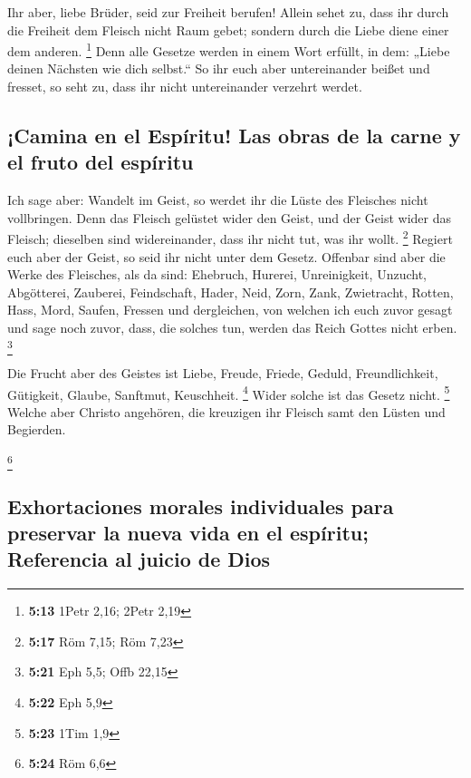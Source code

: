  Ihr aber, liebe Brüder, seid zur Freiheit berufen!
Allein sehet zu, dass ihr durch die Freiheit dem Fleisch nicht Raum
gebet; sondern durch die Liebe diene einer dem anderen. \footnote{\textbf{5:13}
  1Petr 2,16; 2Petr 2,19}  Denn alle Gesetze werden in
einem Wort erfüllt, in dem: „Liebe deinen Nächsten wie dich selbst.``
 So ihr euch aber untereinander beißet und fresset, so
seht zu, dass ihr nicht untereinander verzehrt werdet.

\hypertarget{camina-en-el-espuxedritu-las-obras-de-la-carne-y-el-fruto-del-espuxedritu}{%
\subsection{¡Camina en el Espíritu! Las obras de la carne y el fruto del
espíritu}\label{camina-en-el-espuxedritu-las-obras-de-la-carne-y-el-fruto-del-espuxedritu}}

 Ich sage aber: Wandelt im Geist, so werdet ihr die Lüste
des Fleisches nicht vollbringen.  Denn das Fleisch
gelüstet wider den Geist, und der Geist wider das Fleisch; dieselben
sind widereinander, dass ihr nicht tut, was ihr wollt. \footnote{\textbf{5:17}
  Röm 7,15; Röm 7,23}  Regiert euch aber der Geist, so
seid ihr nicht unter dem Gesetz.  Offenbar sind aber die
Werke des Fleisches, als da sind: Ehebruch, Hurerei, Unreinigkeit,
Unzucht,  Abgötterei, Zauberei, Feindschaft, Hader, Neid,
Zorn, Zank, Zwietracht, Rotten, Hass, Mord,  Saufen,
Fressen und dergleichen, von welchen ich euch zuvor gesagt und sage noch
zuvor, dass, die solches tun, werden das Reich Gottes nicht erben.
\footnote{\textbf{5:21} Eph 5,5; Offb 22,15}

 Die Frucht aber des Geistes ist Liebe, Freude, Friede,
Geduld, Freundlichkeit, Gütigkeit, Glaube, Sanftmut, Keuschheit.
\footnote{\textbf{5:22} Eph 5,9}  Wider solche ist das
Gesetz nicht. \footnote{\textbf{5:23} 1Tim 1,9}  Welche
aber Christo angehören, die kreuzigen ihr Fleisch samt den Lüsten und
Begierden.

\footnote{\textbf{5:24} Röm 6,6}

\hypertarget{exhortaciones-morales-individuales-para-preservar-la-nueva-vida-en-el-espuxedritu-referencia-al-juicio-de-dios}{%
\subsection{Exhortaciones morales individuales para preservar la nueva
vida en el espíritu; Referencia al juicio de
Dios}\label{exhortaciones-morales-individuales-para-preservar-la-nueva-vida-en-el-espuxedritu-referencia-al-juicio-de-dios}}

